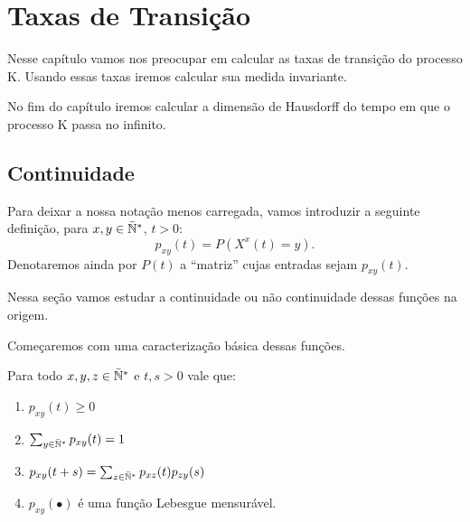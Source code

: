\chapter{Taxas de Transição}
\label{cap:taxas}

Nesse capítulo vamos nos preocupar em calcular as taxas de transição
do processo K. Usando essas taxas iremos calcular sua medida invariante.

No fim do capítulo iremos calcular a dimensão de Hausdorff do tempo em
que o processo K passa no infinito.



\section{Continuidade}
\label{sec:continuidade}

Para deixar a nossa notação menos carregada, vamos introduzir a
seguinte definição, para $x, y \in {\mathbb{\bar{N}^*}}$, $t > 0$:
\begin{equation}
  p_{xy} (t) = P(X^x(t) = y).
\end{equation}
Denotaremos ainda por $P(t)$ a ``matriz'' cujas entradas sejam $p_{xy}(t)$.

Nessa seção vamos estudar a continuidade ou não continuidade dessas
funções na origem.

Começaremos com uma caracterização básica dessas funções.
\begin{proposicao}
  \label{prop:transicao-mensuravel}
  Para todo $x, y, z \in {\mathbb{\bar{N}^*}}$ e $t, s > 0$ vale que:
  \begin{enumerate}
  \item $p_{xy}(t) \geq 0$
  \item $\sum_{y \in {\mathbb{\bar{N}^*}}} p_{xy}(t) = 1$
  \item $p_{xy}(t+s) = \sum_{z\in{\mathbb{\bar{N}^*}}}p_{xz}(t)p_{zy}(s)$
  \item $p_{xy}(\bullet)$ é uma função Lebesgue mensurável.
  \end{enumerate}
\end{proposicao}

